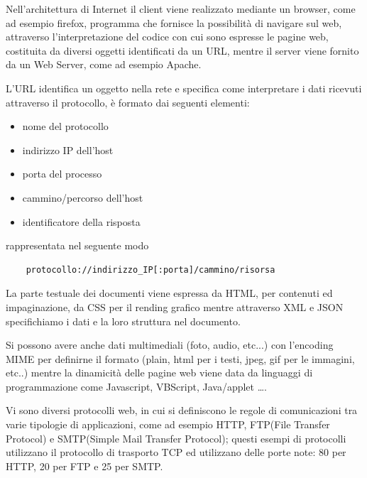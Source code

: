 \documentclass[a4paper,12pt, oneside]{book}
\begin{document}
Nell'architettura di Internet il client viene realizzato mediante un browser, come ad esempio firefox,
programma che fornisce la possibilità di navigare sul web, attraverso l'interpretazione del codice
con cui sono espresse le pagine web, costituita da diversi oggetti identificati da un URL, mentre
il server viene fornito da un Web Server, come ad esempio Apache.

L'URL identifica un oggetto nella rete e specifica come interpretare i dati ricevuti 
attraverso il protocollo, è formato dai seguenti elementi:
\begin{itemize}
    \item nome del protocollo 
    \item indirizzo IP dell'host
    \item porta del processo
    \item cammino/percorso dell'host
    \item identificatore della risposta
\end{itemize}
rappresentata nel seguente modo
\begin{verbatim}
    protocollo://indirizzo_IP[:porta]/cammino/risorsa
\end{verbatim}
La parte testuale dei documenti viene espressa da HTML, per contenuti ed impaginazione, da CSS per 
il rending grafico mentre attraverso XML e JSON specifichiamo i dati e la loro struttura nel documento.

Si possono avere anche dati multimediali (foto, audio, etc...) con l'encoding MIME per definirne 
il formato (plain, html per i testi, jpeg, gif per le immagini, etc..) mentre la dinamicità delle pagine web
viene data da linguaggi di programmazione come Javascript, VBScript, Java/applet \dots .

Vi sono diversi protocolli web, in cui si definiscono le regole di comunicazioni tra varie tipologie di
applicazioni, come ad esempio HTTP, FTP(File Transfer Protocol) e SMTP(Simple Mail Transfer Protocol);
questi esempi di protocolli utilizzano il protocollo di trasporto TCP ed utilizzano delle porte note:
80 per HTTP, 20 per FTP e 25 per SMTP.
\end{document}
